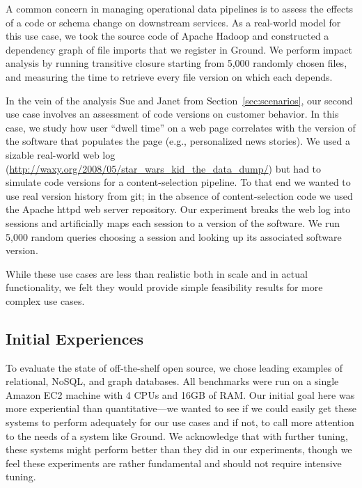 \documentclass{sig-alternate}
\begin{document}
 A common concern in managing operational data pipelines is to assess the effects of a code or schema change on downstream services.
As a real-world model for this use case, we took the source code of Apache Hadoop and constructed a dependency graph of file imports that we register in Ground.
We perform impact analysis by running transitive closure starting from 5,000 randomly chosen files, and measuring the time to retrieve every file version on which each depends.

 In the vein of the analysis Sue and Janet from Section~\ref{sec:scenarios}, our second use case involves an assessment of code versions on customer behavior. 
In this case, we study how user ``dwell time'' on a web page correlates with the version of the software that populates the page (e.g., personalized news stories). 
We used a sizable real-world web log ({\small \url{http://waxy.org/2008/05/star_wars_kid_the_data_dump/}}) %
but had to simulate code versions for a content-selection pipeline. 
To that end we wanted to use real version history from git; in the absence of content-selection code we used the Apache httpd web server repository. 
Our experiment breaks the web log into sessions and artificially maps each session to a version of the software.
We run 5,000 random queries choosing a session and looking up its associated software version.
\smallitembot

While these use cases are less than realistic both in scale and in actual functionality, we felt they would provide simple feasibility results for more complex use cases.

\subsection{Initial Experiences}
\label{sec:perf}
To evaluate the state of off-the-shelf open source, we chose leading examples of relational, NoSQL, and graph databases.
All benchmarks were run on a single Amazon EC2  machine with 4 CPUs and 16GB of RAM. 
Our initial goal here was more experiential than quantitative---we wanted to see if we could easily get these systems to perform adequately for our use cases and if not, to call more attention to the needs of a system like Ground.
We acknowledge that with further tuning, these systems might perform better than they did in our experiments, though we feel these experiments are rather fundamental and should not require intensive tuning.
\end{document}
